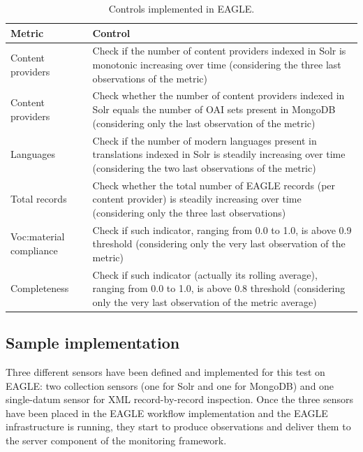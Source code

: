 \documentclass[amsthm,ebook]{saparticle}
\begin{document}
\begin{table}
{\small
\addtolength{\tabcolsep}{-0.5mm}
\begin{tabular*}{\textwidth}{ l l }
\toprule
Metric & Control\\
\midrule
Content providers & \parbox[t]{0.6\textwidth}{Check if the number of content providers indexed in Solr is monotonic increasing over time (considering the three last observations of the metric)}\\
Content providers & \parbox[t]{0.6\textwidth}{Check whether the number of content providers indexed in Solr equals the number of OAI sets present in MongoDB (considering only the last observation of the metric)}\\
Languages & \parbox[t]{0.6\textwidth}{Check if the number of modern languages present in translations indexed in Solr is steadily increasing over time (considering the two last observations of the metric)}\\
Total records & \parbox[t]{0.6\textwidth}{Check whether the total number of EAGLE records (per content provider) is steadily increasing over time (considering only the three last observations)}\\
Voc:material compliance & \parbox[t]{0.6\textwidth}{Check if such indicator, ranging from 0.0 to 1.0, is above 0.9 threshold (considering only the very last observation of the metric)}\\
Completeness & \parbox[t]{0.6\textwidth}{Check if such indicator (actually its rolling average), ranging from 0.0 to 1.0, is above 0.8 threshold (considering only the very last observation of the metric average)}\\
\bottomrule
\end{tabular*}}
\caption{Controls implemented in EAGLE.}
\label{tab:controls}
\end{table}


\subsection{Sample implementation}\label{sample}

Three different sensors have been defined and implemented for this test on EAGLE: two collection sensors (one for Solr and one for MongoDB) and one single-datum sensor for XML record-by-record inspection. Once the three sensors have been placed in the EAGLE workflow implementation and the EAGLE infrastructure is running, they start to produce observations and deliver them to the server component of the monitoring framework.
\end{document}
